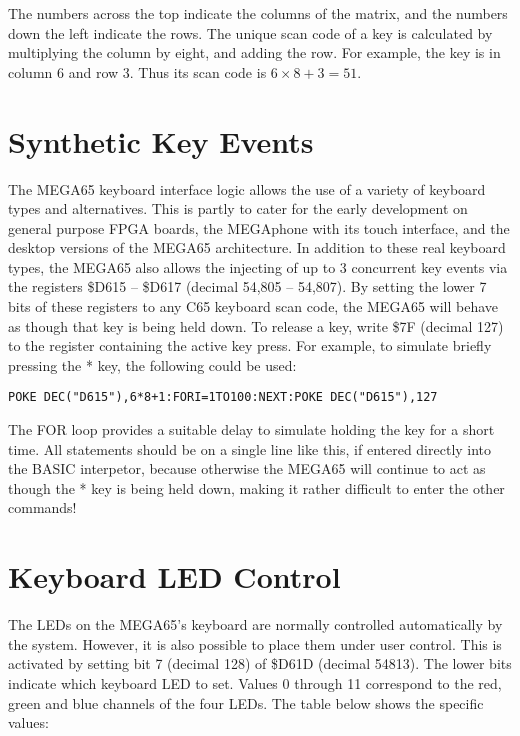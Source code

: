 The numbers across the top indicate the columns of the matrix, and the numbers down the left indicate the rows.
The unique scan code of a key is calculated by multiplying the column by eight, and adding the row.  For example,
the  key is in column 6 and row 3. Thus its scan code is $6 \times 8 + 3 = 51$.

\section{Synthetic Key Events}

The MEGA65 keyboard interface logic allows the use of a variety of keyboard types and alternatives. This is partly
to cater for the early development on general purpose FPGA boards, the MEGAphone with its touch interface, and the
desktop versions of the MEGA65 architecture.  In addition to these real keyboard types, the MEGA65 also allows the
injecting of up to 3 concurrent key events via the registers \$D615 -- \$D617 (decimal 54,805 -- 54,807).  By setting the
lower 7 bits of these registers to any C65 keyboard scan code, the MEGA65 will behave as though that key is being
held down.  To release a key, write \$7F (decimal 127) to the register containing the active key press. For example,
to simulate briefly pressing the * key, the following could be used:

\begin{tcolorbox}[colback=black,coltext=white]
\verbatimfont{\codefont}
\begin{verbatim}
POKE DEC("D615"),6*8+1:FORI=1TO100:NEXT:POKE DEC("D615"),127
\end{verbatim}
\end{tcolorbox}

The FOR loop provides a suitable delay to simulate holding the key for a short time.  All statements should be on a single line
like this, if entered directly into the BASIC interpetor, because otherwise the MEGA65 will continue to act as though the * key
is being held down, making it rather difficult to enter the other commands!

\section{Keyboard LED Control}

The LEDs on the MEGA65's keyboard are normally controlled automatically by the
system.  However, it is also possible to place them under user control.  This
is activated by setting bit 7 (decimal 128) of \$D61D (decimal 54813).  The
lower bits indicate which keyboard LED to set.  Values 0 through 11 correspond
to the red, green and blue channels of the four LEDs. The table below shows the
specific values:

